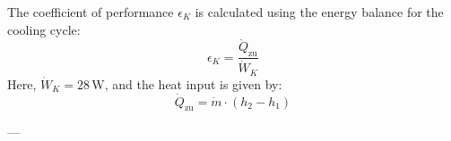 The coefficient of performance \( \epsilon_K \) is calculated using the energy balance for the cooling cycle:  
\[
\epsilon_K = \frac{\dot{Q}_{\text{zu}}}{\dot{W}_K}
\]  
Here, \( \dot{W}_K = 28 \, \text{W} \), and the heat input is given by:  
\[
\dot{Q}_{\text{zu}} = \dot{m} \cdot (h_2 - h_1)
\]

---